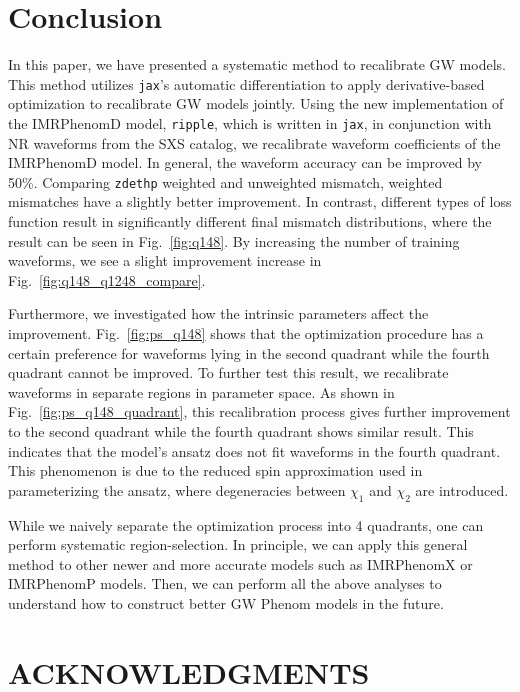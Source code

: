 \documentclass[twocolumn]{aastex631}
\newcommand{\ripple}{\texttt{ripple}}
\newcommand{\jax}{\texttt{jax}}
\newcommand{\zdethp}{\texttt{zdethp}}
\begin{document}

\section{Conclusion} \label{sec:conclusion}

In this paper, we have presented a systematic method to recalibrate GW models.
This method utilizes {\jax}'s automatic differentiation to apply
derivative-based optimization to recalibrate GW models jointly. Using the new
implementation of the IMRPhenomD model, {\ripple}, which is written in \jax, in
conjunction with NR waveforms from the SXS catalog, we recalibrate waveform
coefficients of the IMRPhenomD model. In general, the waveform accuracy can be
improved by 50\%. Comparing {\zdethp} weighted and unweighted mismatch, weighted
mismatches have a slightly better improvement. In contrast, different types of
loss function result in significantly different final mismatch distributions,
where the result can be seen in Fig.~\ref{fig:q148}. By increasing the number of
training waveforms, we see a slight improvement increase in
Fig.~\ref{fig:q148_q1248_compare}. 

Furthermore, we investigated how the intrinsic parameters affect the
improvement. Fig.~\ref{fig:ps_q148} shows that the optimization procedure has a
certain preference for waveforms lying in the second quadrant while the fourth
quadrant cannot be improved. To further test this result, we recalibrate
waveforms in separate regions in parameter space. As shown in
Fig.~\ref{fig:ps_q148_quadrant}, this recalibration process gives further
improvement to the second quadrant while the fourth quadrant shows similar
result. This indicates that the model's ansatz does not fit waveforms in the
fourth quadrant. This phenomenon is due to the reduced spin approximation used
in parameterizing the ansatz, where degeneracies between $\chi_1$ and $\chi_2$
are introduced. 

While we naively separate the optimization process into 4 quadrants, one can
perform systematic region-selection. In principle, we can apply this general
method to other newer and more accurate models such as IMRPhenomX or IMRPhenomP
models. Then, we can perform all the above analyses to understand how to
construct better GW Phenom models in the future.  



\section{ACKNOWLEDGMENTS}



\end{document}
